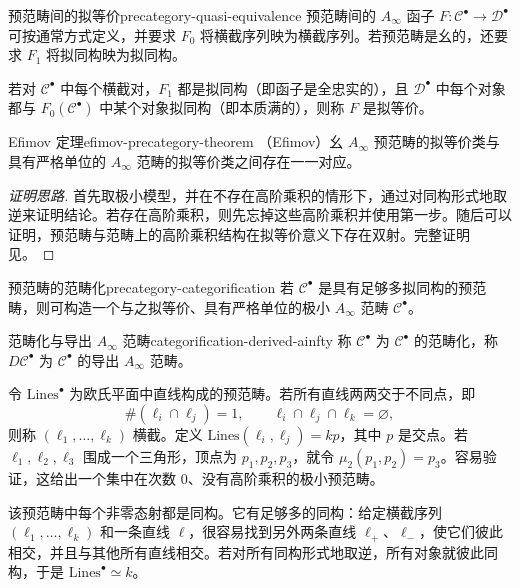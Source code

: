 \begin{definition}{预范畴间的拟等价}{precategory-quasi-equivalence}
预范畴间的 $A_\infty$ 函子 $F\colon\mathcal C^\bullet\to\mathcal D^\bullet$ 可按通常方式定义，并要求 $F_0$ 将横截序列映为横截序列。若预范畴是幺的，还要求 $F_1$ 将拟同构映为拟同构。

若对 $\mathcal C^\bullet$ 中每个横截对，$F_1$ 都是拟同构（即函子是全忠实的），且 $\mathcal D^\bullet$ 中每个对象都与 $F_0(\mathcal C^\bullet)$ 中某个对象拟同构（即本质满的），则称 $F$ 是拟等价。
\end{definition}

\begin{theorem}{Efimov 定理}{efimov-precategory-theorem}\label{thm:efimov-precategory}
（Efimov）幺 $A_\infty$ 预范畴的拟等价类与具有严格单位的 $A_\infty$ 范畴的拟等价类之间存在一一对应。
\end{theorem}
\begin{proof}[证明思路]
首先取极小模型，并在不存在高阶乘积的情形下，通过对同构形式地取逆来证明结论。若存在高阶乘积，则先忘掉这些高阶乘积并使用第一步。随后可以证明，预范畴与范畴上的高阶乘积结构在拟等价意义下存在双射。完整证明见。
\end{proof}

\begin{corollary}{预范畴的范畴化}{precategory-categorification}
若 $\mathcal C^\bullet$ 是具有足够多拟同构的预范畴，则可构造一个与之拟等价、具有严格单位的极小 $A_\infty$ 范畴 $\mathcal C^\bullet$。
\end{corollary}

\begin{definition}{范畴化与导出 $A_\infty$ 范畴}{categorification-derived-ainfty}
称 $\mathcal C^\bullet$ 为 $\mathcal C^\bullet$ 的范畴化，称 $D\mathcal C^\bullet$ 为 $\mathcal C^\bullet$ 的导出 $A_\infty$ 范畴。
\end{definition}

\begin{example}[欧氏平面中的直线预范畴]\label{ex:lines-precategory}
令 $\mathrm{Lines}^\bullet$ 为欧氏平面中直线构成的预范畴。若所有直线两两交于不同点，即
\[
  \#(\ell_i\cap\ell_j)=1,\qquad
  \ell_i\cap\ell_j\cap\ell_k=\varnothing,
\]
则称 $(\ell_1,\ldots,\ell_k)$ 横截。定义 $\mathrm{Lines}(\ell_i,\ell_j)=kp$，其中 $p$ 是交点。若 $\ell_1,\ell_2,\ell_3$ 围成一个三角形，顶点为 $p_1,p_2,p_3$，就令 $\mu_2(p_1,p_2)=p_3$。容易验证，这给出一个集中在次数 $0$、没有高阶乘积的极小预范畴。

该预范畴中每个非零态射都是同构。它有足够多的同构：给定横截序列 $(\ell_1,\ldots,\ell_k)$ 和一条直线 $\ell$，很容易找到另外两条直线 $\ell_+$、$\ell_-$，使它们彼此相交，并且与其他所有直线相交。若对所有同构形式地取逆，所有对象就彼此同构，于是 $\mathrm{Lines}^\bullet\simeq k$。
\end{example}


